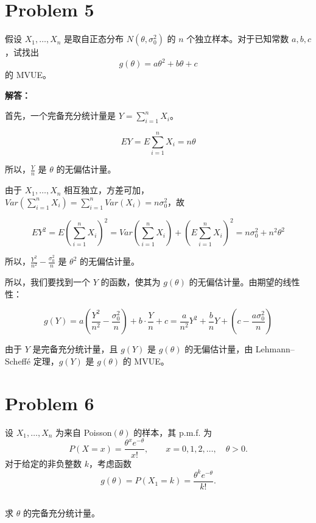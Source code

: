 \documentclass[12pt,a4paper]{article}
\begin{document}
\section{Problem 5}

假设 $X_1,\ldots,X_n$ 是取自正态分布 $N(\theta,\sigma_0^2)$ 的 $n$ 个独立样本。对于已知常数 $a,b,c$，试找出
\[
    g(\theta)=a\theta^2+b\theta+c
\]
的 MVUE。

\begin{answerbox}
\textbf{解答：}

首先，一个完备充分统计量是 $Y = \sum_{i=1}^{n} X_i$。

$$
EY = E\sum_{i=1}^{n} X_i = n\theta
$$

所以，$\frac{Y}{n}$ 是 $\theta$ 的无偏估计量。

由于 $X_1,\ldots,X_n$ 相互独立，方差可加，$Var\left(\sum_{i=1}^{n} X_i\right) = \sum_{i=1}^{n} Var(X_i) = n\sigma_0^2$，故

$$
EY^2 = E\left(\sum_{i=1}^{n} X_i\right)^2 = Var\left(\sum_{i=1}^{n} X_i\right) + \left(E\sum_{i=1}^{n} X_i\right)^2 = n\sigma_0^2 + n^2 \theta^2
$$

所以，$\frac{Y^2}{n^2}-\frac{\sigma_0^2}{n}$ 是 $\theta^2$ 的无偏估计量。

所以，我们要找到一个 $Y$ 的函数，使其为 $g(\theta)$ 的无偏估计量。由期望的线性性：

$$
g(Y) = a\left(\frac{Y^2}{n^2}-\frac{\sigma_0^2}{n}\right) + b \cdot \frac{Y}{n} + c
= \frac{a}{n^2}Y^2 + \frac{b}{n}Y + \left(c - \frac{a\sigma_0^2}{n}\right)
$$

由于 $Y$ 是完备充分统计量，且 $g(Y)$ 是 $g(\theta)$ 的无偏估计量，由 Lehmann--Scheffé 定理，$g(Y)$ 是 $g(\theta)$ 的 MVUE。
\end{answerbox}

\section{Problem 6}

设 $X_1,\ldots,X_n$ 为来自 Poisson$(\theta)$ 的样本，其 p.m.f. 为
\[
    P(X=x)=\frac{\theta^x e^{-\theta}}{x!},\qquad x=0,1,2,\ldots,\quad \theta>0.
\]
对于给定的非负整数 $k$，考虑函数
\[
    g(\theta)=P(X_1=k)=\frac{\theta^k e^{-\theta}}{k!}.
\]

\subsection{}

求 $\theta$ 的完备充分统计量。
\end{document}
